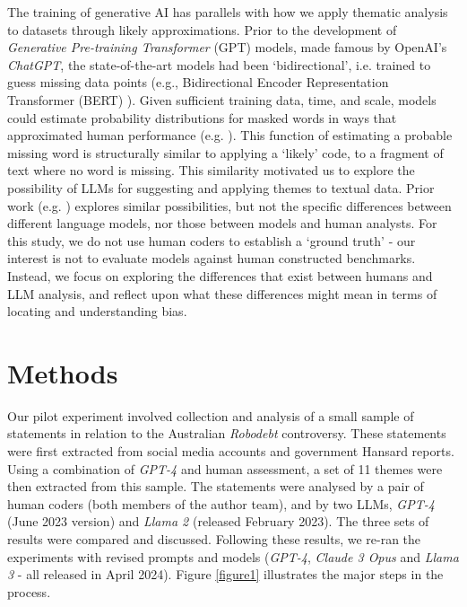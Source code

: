 \documentclass{article}
\begin{document}
The training of generative AI has parallels with how we apply thematic analysis to datasets through likely approximations. Prior to the development of \emph{Generative Pre-training Transformer} (GPT) models, made famous by OpenAI's \emph{ChatGPT}, the state-of-the-art models had been `bidirectional', i.e. trained to guess missing data points (e.g., Bidirectional Encoder Representation Transformer (BERT) \cite{devlinBERTPretrainingDeep2019}). Given sufficient training data, time, and scale, models could estimate probability distributions for masked words in ways that approximated human performance (e.g. \cite{devlinBERTPretrainingDeep2019}). This function of estimating a probable missing word is structurally similar to applying a `likely' code, to a fragment of text where no word is missing. This similarity motivated us to explore the possibility of LLMs for suggesting and applying themes to textual data. Prior work (e.g. \cite{depaoliPerformingInductiveThematic2023, mageeAutomatedResearchPractices2023}) explores similar possibilities, but not the specific differences between different language models, nor those between models and human analysts. For this study, we do not use human coders to establish a `ground truth' - our interest is not to evaluate models against human constructed benchmarks. Instead, we focus on exploring the differences that exist between humans and LLM analysis, and reflect upon what these differences might mean in terms of locating and understanding bias.

\section{Methods}\label{methods}

Our pilot experiment involved collection and analysis of a small sample of statements in relation to the Australian \emph{Robodebt} controversy. These statements were first extracted from social media accounts and government Hansard reports. Using a combination of \emph{GPT-4} and human assessment, a set of 11 themes were then extracted from this sample. The statements were analysed by a pair of human coders (both members of the author team), and by two LLMs, \emph{GPT-4} (June 2023 version) and \emph{Llama 2} (released February 2023). The three sets of results were compared and discussed. Following these results, we re-ran the experiments with revised prompts and models (\emph{GPT-4}, \emph{Claude 3 Opus} and \emph{Llama 3} - all released in April 2024). Figure \ref{figure1} illustrates the major steps in the process.
\end{document}
